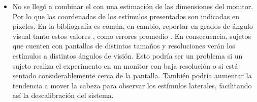 \begin{itemize}
  \item
    No se llegó a combinar el \eyetracking con una estimación de las
    dimensiones del monitor.
    Por lo que las coordenadas de los estímulos presentados son indicadas en
    píxeles.
    En la bibliografía es común, en cambio, reportar en grados de ángulo visual
    tanto estos valores \cite{munoz_2004_look_away,
    olincy_1997_age_diminishes_performance, smyrnis_2002_big_sample}, como
    errores promedio \cite{huang_2016_pace, santini_2017_eyerectoo}.
    En consecuencia, sujetos que cuenten con pantallas de distintos tamaños y
    resoluciones verán los estímulos a distintos ángulos de visión.
    Esto podría ser un problema si un sujeto realiza el experimento en un
    monitor con baja resolución o si está sentado considerablemente cerca de la
    pantalla.
    También podría aumentar la tendencia a mover la cabeza para observar los
    estímulos laterales, facilitando así la descalibración del sistema.

\end{itemize}

